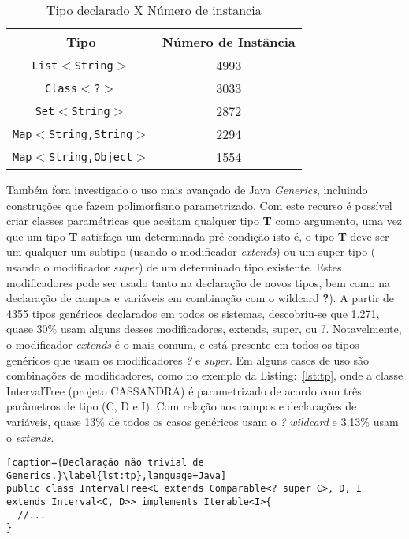 \begin{table}[ht]
	\centering
	\caption{Tipo declarado X Número de instancia}
	\begin{tabular}{cc}
		\hline
		Tipo & Número de Instância\\ 
		\hline \hline
		\texttt{List$<$String$>$} & 4993 \\ 
		\texttt{Class$<$?$>$} & 3033 \\ 
		\texttt{Set$<$String$>$} & 2872 \\ 
		\texttt{Map$<$String,String$>$} & 2294 \\ 
		\texttt{Map$ < $String,Object$>$} & 1554 \\ \hline
	\end{tabular}
	\label{tab:tipoXnumeroInstancia} %
\end{table}

Também fora investigado o uso mais avançado de Java \textit{Generics}, incluindo construções que fazem polimorfismo parametrizado. Com este recurso é possível criar classes paramétricas que aceitam qualquer tipo \textbf{T} como argumento, uma vez que um tipo \textbf{T} satisfaça um determinada pré-condição isto é, o tipo \textbf{T} deve ser um qualquer um subtipo (usando o modificador \textit{extends}) ou um super-tipo ( usando o modificador \textit{super}) de um determinado tipo existente. Estes modificadores pode ser usado tanto na declaração de novos tipos, bem como na declaração de campos e variáveis em combinação com o wildcard \textbf{?}). A partir de 4355 tipos genéricos declarados em todos os sistemas, descobriu-se que 1.271, quase 30\% usam alguns desses modificadores, extends, super, ou ?. Notavelmente, o modificador \textit{extends} é o mais comum, e está presente em todos os tipos genéricos que usam os modificadores \textit{?} e \textit{super}. Em alguns casos de uso são combinações de modificadores, como no exemplo da Listing:~\ref{lst:tp}, onde a classe IntervalTree (projeto CASSANDRA) é parametrizado de acordo com três parâmetros de tipo (C, D e I). Com relação aos campos e declarações de variáveis, quase 13\% de todos os casos genéricos usam o \textit{?} \textit{wildcard} e 3,13\% usam o \textit{extends}.

\begin{lstlisting}[caption={Declaração não trivial de Generics.}\label{lst:tp},language=Java] 
public class IntervalTree<C extends Comparable<? super C>, D, I extends Interval<C, D>> implements Iterable<I>{
  //...
}
\end{lstlisting}


